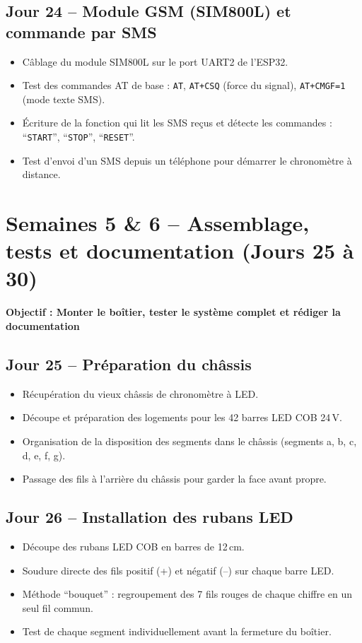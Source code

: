 \documentclass[12pt,a4paper]{article}
\begin{document}
\subsection*{Jour 24 -- Module GSM (SIM800L) et commande par SMS}
\begin{itemize}
    \item Câblage du module SIM800L sur le port UART2 de l'ESP32.
    \item Test des commandes AT de base : \texttt{AT}, \texttt{AT+CSQ} (force du signal), \texttt{AT+CMGF=1} (mode texte SMS).
    \item Écriture de la fonction qui lit les SMS reçus et détecte les commandes : ``\texttt{START}'', ``\texttt{STOP}'', ``\texttt{RESET}''.
    \item Test d'envoi d'un SMS depuis un téléphone pour démarrer le chronomètre à distance.
\end{itemize}

\newpage

\section{Semaines 5 \& 6 -- Assemblage, tests et documentation (Jours 25 à 30)}

\colorbox{semaine5}{\parbox{\linewidth}{\centering\textbf{Objectif : Monter le boîtier, tester le système complet et rédiger la documentation}}}

\bigskip

\subsection*{Jour 25 -- Préparation du châssis}
\begin{itemize}
    \item Récupération du vieux châssis de chronomètre à LED.
    \item Découpe et préparation des logements pour les 42 barres LED COB 24\,V.
    \item Organisation de la disposition des segments dans le châssis (segments a, b, c, d, e, f, g).
    \item Passage des fils à l'arrière du châssis pour garder la face avant propre.
\end{itemize}

\subsection*{Jour 26 -- Installation des rubans LED}
\begin{itemize}
    \item Découpe des rubans LED COB en barres de 12\,cm.
    \item Soudure directe des fils positif (+) et négatif (--) sur chaque barre LED.
    \item Méthode ``bouquet'' : regroupement des 7 fils rouges de chaque chiffre en un seul fil commun.
    \item Test de chaque segment individuellement avant la fermeture du boîtier.
\end{itemize}
\end{document}
